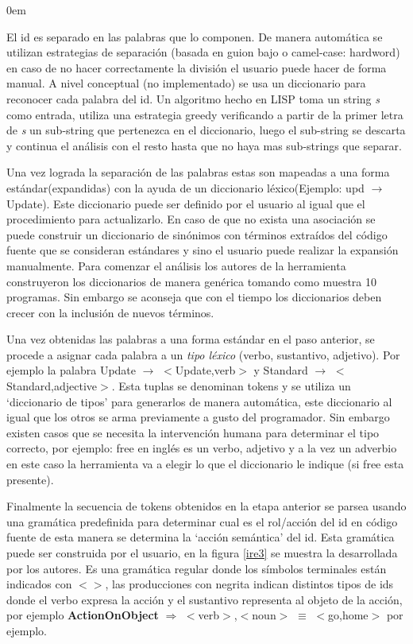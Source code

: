 \documentclass[12pt]{report}
\begin{document}
\begin{description}
\itemsep0em%
\item[Segmentation:] El id es separado en las palabras que lo componen. De manera automática se utilizan estrategias de separación (basada en guion bajo o camel-case: hardword) en caso de no hacer correctamente la división el usuario puede hacer de forma manual. A nivel conceptual (no implementado) se usa un diccionario para reconocer cada palabra del id. Un algoritmo hecho en LISP toma un string \textit{s} como entrada, utiliza una estrategia greedy verificando a partir de la primer letra de \textit{s} un sub-string que pertenezca en el diccionario, luego el sub-string se descarta y continua el análisis con el resto hasta que no haya mas sub-strings que separar\cite{BCPT99}.

\item[Standard Lexicon:] Una vez lograda la separación de las palabras estas son mapeadas a una forma estándar(expandidas) con la ayuda de un diccionario léxico\cite{BCPT99}(Ejemplo: \textsf{upd} $\rightarrow$ \textsf{Update}). Este diccionario puede ser definido por el usuario al igual que el procedimiento para actualizarlo. En caso de que no exista una asociación se puede construir un diccionario de sinónimos con términos extraídos del código fuente que se consideran estándares y sino el usuario puede realizar la expansión manualmente. Para comenzar el análisis los autores\cite{BCPT00} de la herramienta construyeron los diccionarios de manera genérica tomando como muestra 10 programas. Sin embargo se aconseja que con el tiempo los diccionarios deben crecer con la inclusión de nuevos términos.

\item[Tokenization:] Una vez obtenidas las palabras a una forma estándar en el paso anterior, se procede a asignar cada palabra a un \textit{tipo léxico} (verbo, sustantivo, adjetivo). Por ejemplo la palabra Update $\rightarrow$ $<$Update,verb$>$ y Standard $\rightarrow$ $<$Standard,adjective$>$. Esta tuplas se denominan tokens y se utiliza un `diccionario de tipos' para generarlos de manera automática, este diccionario al igual que los otros se arma previamente a gusto del programador\cite{BCPT99}. Sin embargo existen casos que se necesita la intervención humana para determinar el tipo correcto, por ejemplo: free en inglés es un verbo, adjetivo y a la vez un adverbio en este caso la herramienta va a elegir lo que el diccionario le indique (si free esta presente).

\item[Parsing:] Finalmente la secuencia de tokens obtenidos en la etapa anterior se parsea usando una gramática predefinida para determinar cual es el rol/acción del id en código fuente de esta manera se determina la `acción semántica' del id. Esta gramática puede ser construida por el usuario, en la figura \ref{ire3} se muestra la desarrollada por los autores. Es una gramática regular donde los símbolos terminales están indicados con $<>$, las producciones con negrita indican distintos tipos de ids donde el verbo expresa la acción y el sustantivo representa al objeto de la acción, por ejemplo \textbf{ActionOnObject} $\Rightarrow$ $<$verb$>$,$<$noun$>$ $\equiv$ $<$go,home$>$ por ejemplo.


\end{description}
\end{document}
